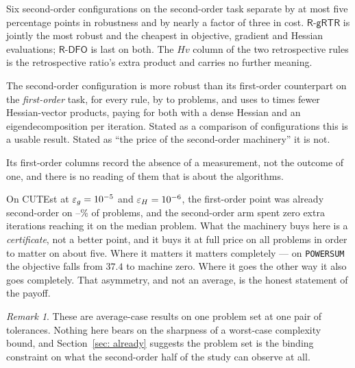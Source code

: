 \documentclass[11pt,a4paper]{article}
\providecommand{\Rdfo}{\textsf{R-DFO}}
\providecommand{\Rgrtr}{\textsf{R-gRTR}}
\theoremstyle{remark}
\newtheorem{remark}{Remark}
\begin{document}
\begin{description}[leftmargin=1.8em, style=nextline]
  \item[P1, without qualification.] Six second-order configurations on the
    second-order task separate by at most five percentage points in robustness and
    by nearly a factor of three in cost. $\Rgrtr$ is jointly the most robust and
    the cheapest in objective, gradient and Hessian evaluations; $\Rdfo$ is last
    on both. The $Hv$ column of the two retrospective rules is the retrospective
    ratio's extra product and carries no further meaning.
  \item[P2, with the confound named in the sentence.] The second-order
    configuration is more robust than its first-order counterpart on the
    \emph{first-order} task, for every rule, by \PtwoGainMin{} to \PtwoGainMax{}
    problems, and uses \PtwoHpMin{} to \PtwoHpMax{} times fewer Hessian-vector
    products, paying for both with a dense Hessian and an eigendecomposition per
    iteration. Stated as a comparison of configurations this is a usable result.
    Stated as ``the price of the second-order machinery'' it is not.
  \item[P3, not at all.] Its first-order columns record the absence of a
    measurement, not the outcome of one, and there is no reading of them that is
    about the algorithms.
  \item[The finding that reframes the campaign.] On CUTEst at
    $\varepsilon_g = 10^{-5}$ and $\varepsilon_H = 10^{-6}$, the first-order point was
    already second-order on \CurvAlreadyMin--\CurvAlreadyMax\% of problems, and
    the second-order arm spent zero extra iterations reaching it on the median
    problem. What the machinery buys here is a \emph{certificate}, not a better
    point, and it buys it at full price on all \NOpened{} problems in order to
    matter on about five. Where it matters it matters completely --- on
    \texttt{POWERSUM} the objective falls from $37.4$ to machine zero. Where it
    goes the other way it also goes completely. That asymmetry, and not an
    average, is the honest statement of the payoff.
\end{description}

\begin{remark}
These are average-case results on one problem set at one pair of tolerances.
Nothing here bears on the sharpness of a worst-case complexity bound, and
Section~\ref{sec: already} suggests the problem set is the binding constraint on
what the second-order half of the study can observe at all.
\end{remark}
\end{document}
